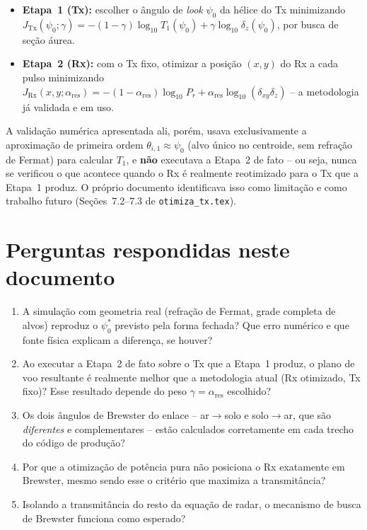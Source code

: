 \documentclass[12pt,a4paper,oneside]{book}
\theoremstyle{definition}
\theoremstyle{remark}
\newcommand{\Prcv}{P_r}
\newcommand{\dxy}{\delta_{xy}}
\newcommand{\dz}{\delta_z}
\begin{document}
\begin{itemize}
  \item \textbf{Etapa~1 (Tx):} escolher o ângulo de \textit{look} $\psi_0$ da
  hélice do Tx minimizando $J_{\mathrm{Tx}}(\psi_0;\gamma)=-(1-\gamma)\log_{10}T_1(\psi_0)+\gamma\log_{10}\dz(\psi_0)$,
  por busca de seção áurea.
  \item \textbf{Etapa~2 (Rx):} com o Tx fixo, otimizar a posição $(x,y)$ do
  Rx a cada pulso minimizando $J_{\mathrm{Rx}}(x,y;\alpha_{\mathrm{res}})=-(1-\alpha_{\mathrm{res}})\log_{10}\Prcv+\alpha_{\mathrm{res}}\log_{10}(\dxy\dz)$
  -- a metodologia já validada e em uso.
\end{itemize}

A validação numérica apresentada ali, porém, usava exclusivamente a
aproximação de primeira ordem $\theta_{i,1}\approx\psi_0$ (alvo único no
centroide, sem refração de Fermat) para calcular $T_1$, e \textbf{não}
executava a Etapa~2 de fato -- ou seja, nunca se verificou o que acontece
quando o Rx é realmente reotimizado para o Tx que a Etapa~1 produz. O
próprio documento identificava isso como limitação e como trabalho futuro
(Seções~7.2--7.3 de \texttt{otimiza\_tx.tex}).

\section{Perguntas respondidas neste documento}

\begin{enumerate}
  \item A simulação com geometria real (refração de Fermat, grade completa
  de alvos) reproduz o $\psi_0^*$ previsto pela forma fechada? Que erro
  numérico e que fonte física explicam a diferença, se houver?
  \item Ao executar a Etapa~2 de fato sobre o Tx que a Etapa~1 produz, o
  plano de voo resultante é realmente melhor que a metodologia atual (Rx
  otimizado, Tx fixo)? Esse resultado depende do peso
  $\gamma=\alpha_{\mathrm{res}}$ escolhido?
  \item Os dois ângulos de Brewster do enlace -- ar$\to$solo e solo$\to$ar,
  que são \emph{diferentes} e complementares -- estão calculados
  corretamente em cada trecho do código de produção?
  \item Por que a otimização de potência pura não posiciona o Rx exatamente
  em Brewster, mesmo sendo esse o critério que maximiza a transmitância?
  \item Isolando a transmitância do resto da equação de radar, o mecanismo
  de busca de Brewster funciona como esperado?
\end{enumerate}
\end{document}
